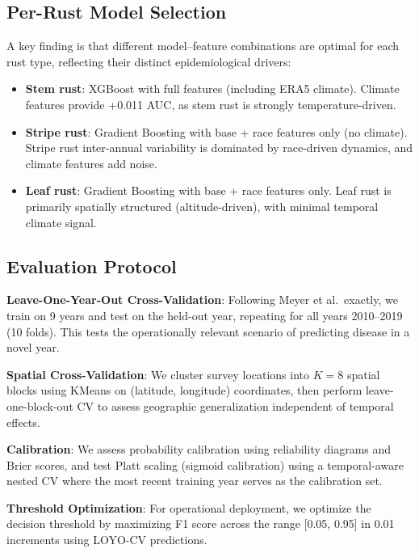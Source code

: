 \documentclass[10pt,twocolumn,letterpaper]{article}
\begin{document}
\subsection{Per-Rust Model Selection}

A key finding is that different model--feature combinations are optimal for each rust type, reflecting their distinct epidemiological drivers:

\begin{itemize}
\item \textbf{Stem rust}: XGBoost with full features (including ERA5 climate). Climate features provide +0.011 AUC, as stem rust is strongly temperature-driven.
\item \textbf{Stripe rust}: Gradient Boosting with base + race features only (no climate). Stripe rust inter-annual variability is dominated by race-driven dynamics, and climate features add noise.
\item \textbf{Leaf rust}: Gradient Boosting with base + race features only. Leaf rust is primarily spatially structured (altitude-driven), with minimal temporal climate signal.
\end{itemize}

\subsection{Evaluation Protocol}

\noindent\textbf{Leave-One-Year-Out Cross-Validation}: Following Meyer et al.\ exactly, we train on 9 years and test on the held-out year, repeating for all years 2010--2019 (10 folds). This tests the operationally relevant scenario of predicting disease in a novel year.

\noindent\textbf{Spatial Cross-Validation}: We cluster survey locations into $K=8$ spatial blocks using KMeans on (latitude, longitude) coordinates, then perform leave-one-block-out CV to assess geographic generalization independent of temporal effects.

\noindent\textbf{Calibration}: We assess probability calibration using reliability diagrams and Brier scores, and test Platt scaling (sigmoid calibration) using a temporal-aware nested CV where the most recent training year serves as the calibration set.

\noindent\textbf{Threshold Optimization}: For operational deployment, we optimize the decision threshold by maximizing F1 score across the range [0.05, 0.95] in 0.01 increments using LOYO-CV predictions.
\end{document}
